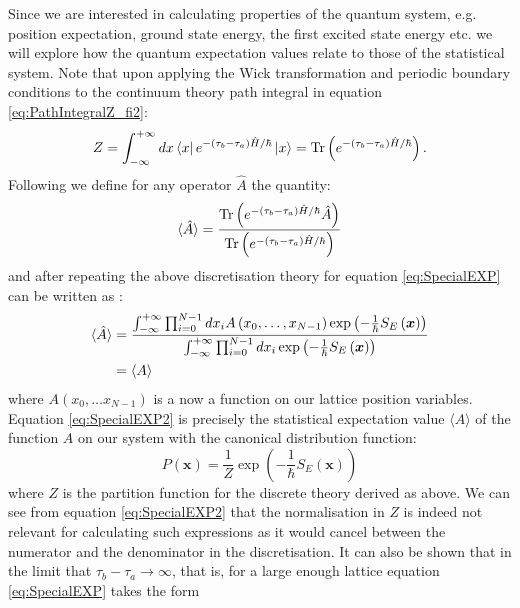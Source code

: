 \documentclass[12pt]{article}
\begin{document}
        Since we are interested in calculating properties of the quantum system, e.g. position expectation, ground state energy, the first excited state energy etc. we will explore how the quantum expectation values relate to those of the statistical system. Note that upon applying the Wick transformation and periodic boundary conditions to the continuum theory path integral in equation \ref{eq:PathIntegralZ_fi2}:
        \begin{equation}
            Z = \int_{-\infty}^{+\infty} dx \bra{x}e^{-\left(\tau_b-\tau_a\right)\hat{H}/\hbar}\ket{x} = \text{Tr}\left(e^{-\left(\tau_b-\tau_a\right)\hat{H}/\hbar}\right).
        \end{equation}
        Following \cite{creutz_freedman_1981} we define for any operator $\hat{A}$ the quantity:
        \begin{equation}
            \label{eq:SpecialEXP}
            \braket{\hat{A}} = \frac{\text{Tr}\left(e^{-\left(\tau_b-\tau_a\right)\hat{H}/\hbar}\hat{A}\right)}{\text{Tr}\left(e^{-\left(\tau_b-\tau_a\right)\hat{H}/\hbar}\right)}
        \end{equation}
        and after repeating the above discretisation theory for equation \ref{eq:SpecialEXP} can be written as \cite{creutz_freedman_1981}:
        \begin{align}
            \label{eq:SpecialEXP2}
            \braket{\hat{A}} & = \frac{\int^{+\infty}_{-\infty}\prod_{i=0}^{N-1}dx_i A\left(x_0,\dots,x_{N-1}\right)\exp{\left(-\frac{1}{\hbar}S_{E}\left(\bm{x}\right)\right)}}{\int^{+\infty}_{-\infty}\prod_{i=0}^{N-1}dx_i \exp{\left(-\frac{1}{\hbar}S_{E}\left(\bm{x}\right)\right)}}\\
            & = \langle A \rangle
        \end{align}
        where $A\left(x_0,\dots x_{N-1}\right)$ is a now a function on our lattice position variables. Equation \ref{eq:SpecialEXP2} is precisely the statistical expectation value $\langle A \rangle$ of the function $A$ on our system with the canonical distribution function:
        \begin{equation}
            P\left(\bm{x}\right) = \frac{1}{Z}\exp{\left(-\frac{1}{\hbar}S_{E}\left(\bm{x}\right)\right)}
        \end{equation}
        where $Z$ is the partition function for the discrete theory derived as above. We can see from equation \ref{eq:SpecialEXP2} that the normalisation in $Z$ is indeed not relevant for calculating such expressions as it would cancel between the numerator and the denominator in the discretisation. It can also be shown that in the limit that $\tau_b - \tau_a \rightarrow \infty$, that is, for a large enough lattice equation \ref{eq:SpecialEXP} takes the form \cite{creutz_freedman_1981}
\end{document}
